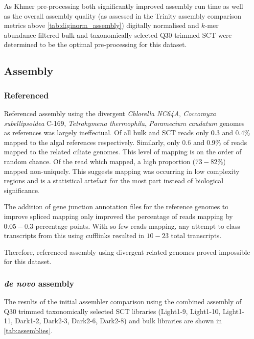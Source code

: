 As Khmer pre-processing both significantly improved assembly run time as well as the overall
assembly quality (as assessed in the Trinity assembly comparison metrics above \cref{tab:diginorm_assembly})
digitally normalised and \(k\)-mer abundance filtered bulk and taxonomically selected Q30
trimmed SCT were determined to be the optimal pre-processing for this dataset. 

\subsection{Assembly}

\subsubsection{Referenced}

Referenced assembly using the divergent \textit{Chlorella NC64A},
\textit{Coccomyxa subellipsoidea} C-169, \textit{Tetrahymena thermophila},
\textit{Paramecium caudatum} genomes as references was largely ineffectual.
Of all bulk and SCT reads only \(0.3\) and \(0.4\%\) mapped to the 
algal references respectively.  Similarly, only \(0.6\) and \(0.9\%\) of reads mapped 
to the related ciliate genomes.   This level of mapping is on the order
of random chance. Of the read which mapped, a high proportion (\(73-82\%\))
mapped non-uniquely. 
This suggests mapping was occurring in low complexity regions and is a statistical
artefact for the most part instead of biological significance.

The addition of gene junction annotation files for the reference genomes to improve
spliced mapping only improved the percentage of reads mapping by \(0.05-0.3\) percentage points.  
With so few reads mapping, any attempt to class transcripts from this using cufflinks 
resulted in \(10-23\) total transcripts.

Therefore, referenced assembly using divergent related genomes proved impossible
for this dataset.

\subsubsection{\textit{de novo} assembly} 

The results of the initial assembler comparison using the combined assembly of 
Q30 trimmed taxonomically selected SCT libraries (Light1-9, Light1-10, Light1-11, 
Dark1-2, Dark2-3, Dark2-6, Dark2-8) and bulk libraries are shown in
\cref{tab:assemblies}. 

